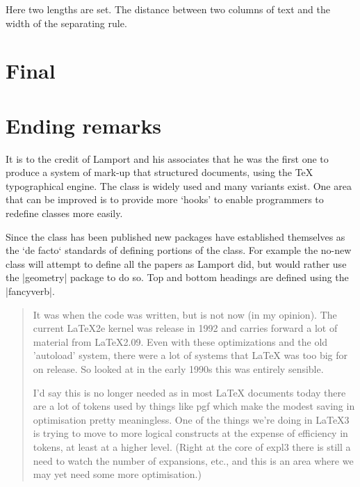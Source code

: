 \quad Here two lengths are set. The distance between two columns of text and the width of the separating rule.

\begin{teX}
\setlength{}
\setlength{}
\end{teX}


\section{Final}


\section{Ending remarks}

It is to the credit of Lamport and his associates that he was the first one to produce a system of mark-up that structured documents, using the TeX typographical engine. The class is widely used and many variants exist. One area that can be improved is to provide more `hooks' to enable programmers to redefine classes more easily.

Since the class has been published new packages have established themselves as the `de facto` standards of defining portions of the class. For example the no-new class will attempt to define all the papers as Lamport did, but would rather use the |geometry| package to do so. Top and bottom headings are defined using the |fancyverb|. 

\begin{quotation}
It was when the code was written, but is not now (in my opinion). The current LaTeX2e kernel was release in 1992 and carries forward a lot of material from LaTeX2.09. Even with these optimizations and the old 'autoload' system, there were a lot of systems that LaTeX was too big for on release. So looked at in the early 1990s this was entirely sensible.

I'd say this is no longer needed as in most LaTeX documents today there are a lot of tokens used by things like pgf which make the modest saving in optimisation pretty meaningless. One of the things we're doing in LaTeX3 is trying to move to more logical constructs at the expense of efficiency in tokens, at least at a higher level. (Right at the core of expl3 there is still a need to watch the number of expansions, etc., and this is an area where we may yet need some more optimisation.)

\end{quotation}

